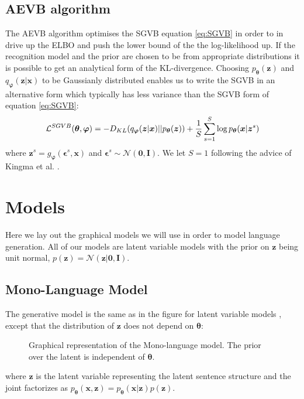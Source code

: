 \subsection{AEVB algorithm}
The AEVB algorithm optimises the SGVB equation \eqref{eq:SGVB} in order to in
drive up the ELBO and push the lower bound of the the log-likelihood up. If the
recognition model and the prior are chosen to be from appropriate distributions
it is possible to get an analytical form of the KL-divergence. Choosing
$p_{\bm{\theta}}(\bm{z})$ and $q_{\bm{\varphi}}(\bm{z} | \bm{x})$ to be
Gaussianly distributed enables us to write the SGVB in an alternative form which
typically has less variance than the SGVB form of equation \eqref{eq:SGVB}:
\begin{equation}
  \label{eq:SGVB_analytical_KL}
  \mathcal{L}^{SGVB}(\bm{\theta}, \bm{\varphi}) = -D_{KL}(q_{\bm{\varphi}}(\bm{z} | \bm{x}) || p_{\bm{\theta}}(\bm{z})) + \frac{1}{S} \sum_{s=1}^S \log p_{\bm{\theta}}(\bm{x} | \bm{z}^{s})
\end{equation}
where $\bm{z}^{s} = g_{\bm{\varphi}}(\bm{\epsilon}^{s}, \bm{x})$ and
$\bm{\epsilon}^{s} \sim \mathcal{N}(\bm{0},
\bm{I})$. We let $S = 1$ following the advice
of Kingma et al. \cite{kingma_auto-encoding_2013}.

\section{Models}

Here we lay out the graphical models we will use in order to model language
generation. All of our models are latent variable models with the prior on
$\bm{z}$ being unit normal, $p(\bm{z}) = \mathcal{N}(\bm{z}| \bm{0}, \bm{I})$.

\subsection{Mono-Language Model}

The generative model is the same as in the figure for latent variable models
, except that the distribution of $\bm{z}$ does not depend on $\bm{\theta}$:
\begin{figure}[H]
  \center
  \label{tikz:reconstruction_model}
  \caption{Graphical representation of the Mono-language model. The prior over
    the latent is independent of $\bm{\theta}$.}
\end{figure}
where $\bm{z}$ is the latent variable representing the latent sentence structure
and the joint factorizes as $p_{\bm{\theta}}(\bm{x}, \bm{z}) =
p_{\bm{\theta}}(\bm{x} | \bm{z})p(\bm{z})$.

